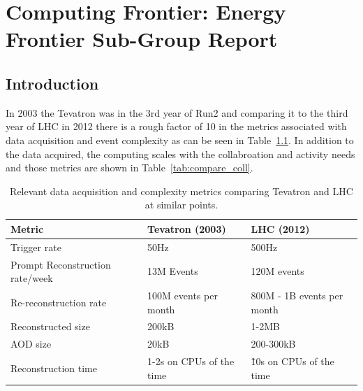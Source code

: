  
\chapter{Computing Frontier: Energy Frontier Sub-Group Report}
\label{chap:E2}


\begin{center}\begin{boldmath}



\end{boldmath}\end{center}


\section{Introduction}
\label{sec:comp-intro}

In 2003 the Tevatron was in the 3rd year of Run2 and comparing it to the third 
year of LHC in 2012 there is a rough factor of 10 in the metrics associated with 
data acquisition and event complexity as can be seen in Table~\ref{tab:compare_daq}. In addition to the data acquired, the computing scales with the collabroation and activity needs and those metrics are shown in Table~\ref{tab:compare_coll}.

\begin{table}[t]
\begin{center}
\begin{tabular}{lll}
Metric & Tevatron (2003) & LHC (2012) \\ \hline
Trigger rate & 50Hz & 500Hz \\
Prompt Reconstruction rate/week & 13M Events & 120M events \\
Re-reconstruction rate & 100M events per month & 800M - 1B events per month \\
Reconstructed size & 200kB & 1-2MB \\
AOD size & 20kB & 200-300kB \\
Reconstruction time & 1-2s on CPUs of the time & \~ 10s on CPUs of the time \\ \hline
\end{tabular}
\caption{Relevant data acquisition and complexity metrics comparing Tevatron and LHC at similar points.}
\label{tab:compare_daq}
\end{center}
\end{table}



